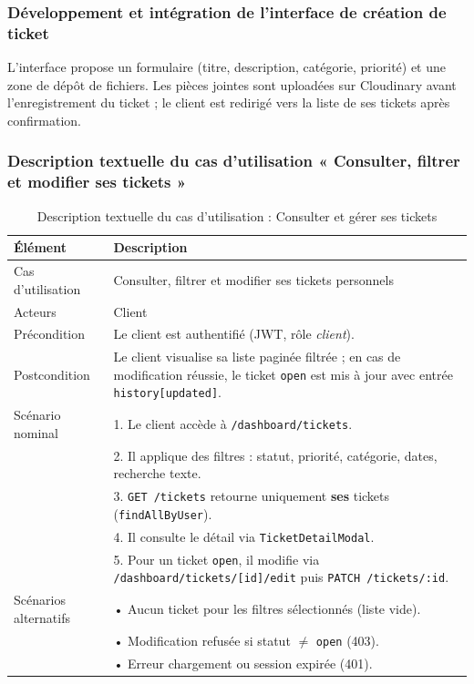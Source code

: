 \subsubsection{Développement et intégration de l'interface de création de ticket}
L'interface propose un formulaire (titre, description, catégorie, priorité) et une zone de dépôt de fichiers. Les pièces jointes sont uploadées sur Cloudinary avant l'enregistrement du ticket ; le client est redirigé vers la liste de ses tickets après confirmation.


\subsubsection{Description textuelle du cas d'utilisation « Consulter, filtrer et modifier ses tickets »}

\begin{table}[H]
\centering
\footnotesize
\renewcommand{\arraystretch}{0.8}
\setlength{\tabcolsep}{4pt}
\begin{tabular}{|p{3cm}|p{9cm}|}
\hline
\textbf{Élément} & \textbf{Description} \\
\hline
Cas d'utilisation & Consulter, filtrer et modifier ses tickets personnels \\
\hline
Acteurs & Client \\
\hline
Précondition & Le client est authentifié (JWT, rôle \textit{client}). \\
\hline
Postcondition & Le client visualise sa liste paginée filtrée ; en cas de modification réussie, le ticket \texttt{open} est mis à jour avec entrée \texttt{history[updated]}. \\
\hline
Scénario nominal &
1. Le client accède à \texttt{/dashboard/tickets}.\\
& 2. Il applique des filtres : statut, priorité, catégorie, dates, recherche texte.\\
& 3. \texttt{GET /tickets} retourne uniquement \textbf{ses} tickets (\texttt{findAllByUser}).\\
& 4. Il consulte le détail via \texttt{TicketDetailModal}.\\
& 5. Pour un ticket \texttt{open}, il modifie via \texttt{/dashboard/tickets/[id]/edit} puis \texttt{PATCH /tickets/:id}.\\
\hline
Scénarios alternatifs &
• Aucun ticket pour les filtres sélectionnés (liste vide).\\
& • Modification refusée si statut $\neq$ \texttt{open} (403).\\
& • Erreur chargement ou session expirée (401).\\
\hline
\end{tabular}
\caption{Description textuelle du cas d'utilisation : Consulter et gérer ses tickets}
\label{tab:cu-consult-ticket}
\end{table}

